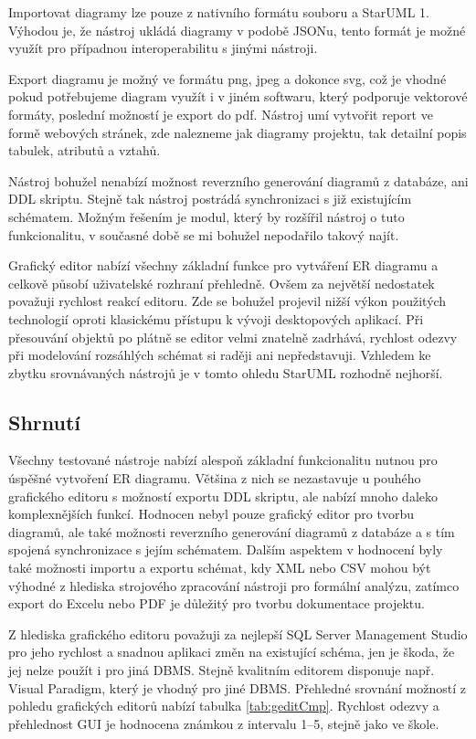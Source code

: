\documentclass[czech,bachelor,public,dept460,male,oneside]{diploma}
\begin{document}
		Importovat diagramy lze pouze z nativního formátu souboru a StarUML 1. Výhodou je, že nástroj ukládá diagramy v podobě JSONu, tento formát je možné využít pro případnou interoperabilitu s jinými nástroji.
		
		Export diagramu je možný ve formátu png, jpeg a dokonce svg, což je vhodné pokud potřebujeme diagram využít i v jiném softwaru, který podporuje vektorové formáty, poslední možností je export do pdf. Nástroj umí vytvořit report ve formě webových stránek, zde nalezneme jak diagramy projektu, tak detailní popis tabulek, atributů a vztahů. 
		
		Nástroj bohužel nenabízí možnost reverzního generování diagramů z databáze, ani DDL skriptu. Stejně tak nástroj postrádá synchronizaci s již existujícím schématem. Možným řešením je modul, který by rozšířil nástroj o tuto funkcionalitu, v současné době se mi bohužel nepodařilo takový najít.
		
		Grafický editor nabízí všechny základní funkce pro vytváření ER diagramu a celkově působí uživatelské rozhraní přehledně. Ovšem za největší nedostatek považuji rychlost reakcí editoru. Zde se bohužel projevil nižší výkon použitých technologií oproti klasickému přístupu k vývoji desktopových aplikací. Při přesouvání objektů po plátně se editor velmi znatelně zadrhává, rychlost odezvy při modelování rozsáhlých schémat si raději ani nepředstavuji. Vzhledem ke zbytku srovnávaných nástrojů je v tomto ohledu StarUML rozhodně nejhorší.
	
	\subsection{Shrnutí}
	Všechny testované nástroje nabízí alespoň základní funkcionalitu nutnou pro úspěšné vytvoření ER diagramu. Většina z nich se nezastavuje u pouhého grafického editoru s možností exportu DDL skriptu, ale nabízí mnoho daleko komplexnějších funkcí. Hodnocen nebyl pouze grafický editor pro tvorbu diagramů, ale také možnosti reverzního generování diagramů z databáze a s tím spojená synchronizace s jejím schématem. Dalším aspektem v hodnocení byly také možnosti importu a exportu schémat, kdy XML nebo CSV mohou být výhodné z hlediska strojového zpracování nástroji pro formální analýzu, zatímco export do Excelu nebo PDF je důležitý pro tvorbu dokumentace projektu.
	
	Z hlediska grafického editoru považuji za nejlepší SQL Server Management Studio pro jeho rychlost a snadnou aplikaci změn na existující schéma, jen je škoda, že jej nelze použít i pro jiná DBMS. Stejně kvalitním editorem disponuje např. Visual Paradigm, který je vhodný pro jiné DBMS. Přehledné srovnání možností z pohledu grafických editorů nabízí tabulka \ref{tab:geditCmp}. Rychlost odezvy a přehlednost GUI je hodnocena známkou z intervalu 1--5, stejně jako ve škole.
	
\end{document}

